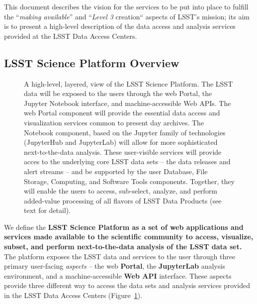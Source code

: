 \documentclass[DM,lsstdraft,toc]{lsstdoc}
\begin{document}
This document describes the vision for the services to be put into place to
fulfill the ``{\em making available}'' and ``{\em Level 3} creation``
aspects of LSST's mission; its aim is to present a high-level
description of the data access and analysis services provided at the
LSST Data Access Centers.

\subsection{LSST Science Platform Overview}

\begin{figure}
\centering
{}
\caption{
A high-level, layered, view of the LSST Science Platform.  The LSST data
will be exposed to the users through the web Portal, the Jupyter Notebook
interface, and machine-accessible Web APIs.  The web Portal component will
provide the essential data access and visualization services common to
present day archives.  The Notebook component, based on the Jupyter family
of technologies (JupyterHub and JupyterLab) will allow for more
sophisticated next-to-the-data analysis.  These user-visible services will
provide acces to the underlying core LSST data sets -- the data releases and
alert streams -- and be supported by the user Database, File Storage,
Computing, and Software Tools components.  Together, they will enable the
users to access, sub-select, analyze, and perform added-value processing of
all flavors of LSST Data Products (see text for detail). 
\label{fig:layeredLSP}}
\end{figure}

We define the {\bf LSST Science Platform as a set of web applications and services
made available to the scientific community to access, visualize, subset, and
perform next-to-the-data analysis of the LSST data set.}  The platform exposes the LSST data
and services to the user through three primary user-facing {\it aspects} -- the web {\bf Portal},
the {\bf JupyterLab} analysis environment, and a machine-accessible {\bf Web API} interface. These aspects provide three different way to access the data sets and analysis services provided in the LSST Data Access Centers (Figure~\ref{fig:layeredLSP}).
\end{document}
